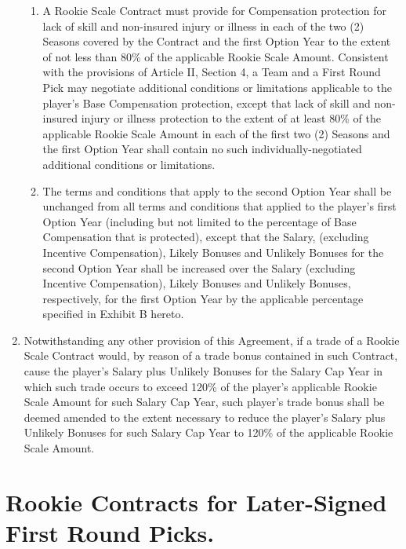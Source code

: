 \documentclass[
]{book}
\begin{document}
\begin{enumerate}
\begin{enumerate}
  \item
    A Rookie Scale Contract must provide for Compensation protection for lack of skill and non-insured injury or illness in each of the two (2) Seasons covered by the Contract and the first Option Year to the extent of not less than 80\% of the applicable Rookie Scale Amount. Consistent with the provisions of Article II, Section 4, a Team and a First Round Pick may negotiate additional conditions or limitations applicable to the player's Base Compensation protection, except that lack of skill and non-insured injury or illness protection to the extent of at least 80\% of the applicable Rookie Scale Amount in each of the first two (2) Seasons and the first Option Year shall contain no such individually-negotiated additional conditions or limitations.
  \item
    The terms and conditions that apply to the second Option Year shall be unchanged from all terms and conditions that applied to the player's first Option Year (including but not limited to the percentage of Base Compensation that is protected), except that the Salary, (excluding Incentive Compensation), Likely Bonuses and Unlikely Bonuses for the second Option Year shall be increased over the Salary (excluding Incentive Compensation), Likely Bonuses and Unlikely Bonuses, respectively, for the first Option Year by the applicable percentage specified in Exhibit B hereto.
  \end{enumerate}
\item
  Notwithstanding any other provision of this Agreement, if a trade of a Rookie Scale Contract would, by reason of a trade bonus contained in such Contract, cause the player's Salary plus Unlikely Bonuses for the Salary Cap Year in which such trade occurs to exceed 120\% of the player's applicable Rookie Scale Amount for such Salary Cap Year, such player's trade bonus shall be deemed amended to the extent necessary to reduce the player's Salary plus Unlikely Bonuses for such Salary Cap Year to 120\% of the applicable Rookie Scale Amount.
\end{enumerate}

\hypertarget{rookie-contracts-for-later-signed-first-round-picks.}{%
\section{Rookie Contracts for Later-Signed First Round Picks.}\label{rookie-contracts-for-later-signed-first-round-picks.}}
\end{document}
